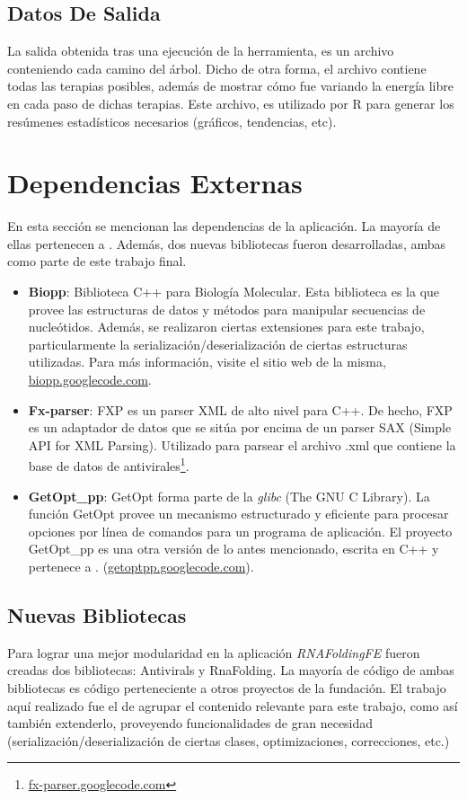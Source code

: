 \subsection{Datos De Salida}
La salida obtenida tras una ejecuci\'on de la herramienta, es un archivo conteniendo cada camino del \'arbol. Dicho de otra forma, el archivo contiene
todas las terapias posibles, adem\'as de mostrar c\'omo fue variando la energ\'ia libre en cada paso de dichas terapias. Este archivo, es utilizado por
R para generar los res\'umenes estad\'isticos necesarios (gr\'aficos, tendencias, etc).
 

\section{Dependencias Externas}
En esta secci\'on se mencionan las dependencias de la aplicaci\'on. La mayor\'ia de ellas pertenecen a \fudepan. Adem\'as, dos nuevas bibliotecas
fueron desarrolladas, ambas como parte de este trabajo final.

\begin{itemize}
  \item \textbf{Biopp}: Biblioteca C++ para Biolog\'ia Molecular. Esta biblioteca es la que provee las estructuras de datos y m\'etodos para
    manipular secuencias de nucle\'otidos. Adem\'as, se realizaron ciertas extensiones para este trabajo, particularmente la
    serializaci\'on/deserializaci\'on de ciertas estructuras utilizadas. Para m\'as informaci\'on, visite el sitio web de la misma, \url{biopp.googlecode.com}.
  \item \textbf{Fx-parser}: FXP es un parser XML de alto nivel para C++. De hecho, FXP es un adaptador de datos que se sit\'ua por encima de un parser
    SAX (Simple API for XML Parsing). Utilizado para parsear el archivo .xml que contiene la base de datos de
    antivirales\footnote{\url{fx-parser.googlecode.com}}.
  \item \textbf{GetOpt\_pp}: GetOpt forma parte de la \textit{glibc} (The GNU C Library). La funci\'on GetOpt provee un mecanismo estructurado y eficiente para
    procesar opciones por l\'inea de comandos para un programa de aplicaci\'on. El proyecto GetOpt\_pp es una otra versi\'on de lo antes mencionado, escrita en C++
    y pertenece a \fudepan. (\url{getoptpp.googlecode.com}).
\end{itemize}

\subsection{Nuevas Bibliotecas}
Para lograr una mejor modularidad en la aplicaci\'on \emph{RNAFoldingFE} fueron creadas dos bibliotecas: Antivirals y RnaFolding. La mayor\'ia de
c\'odigo de ambas bibliotecas es c\'odigo perteneciente a otros proyectos de la fundaci\'on. El trabajo aqu\'i realizado fue el de agrupar el
contenido relevante para este trabajo, como as\'i tambi\'en extenderlo, proveyendo funcionalidades de gran necesidad
(serializaci\'on/deserializaci\'on de ciertas clases, optimizaciones, correcciones, etc.)

